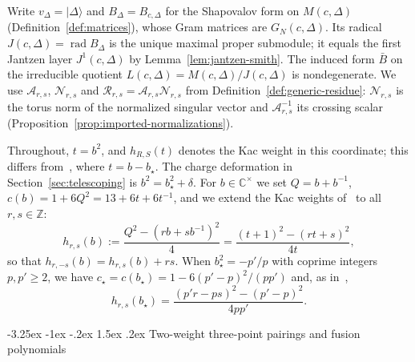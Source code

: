 \documentclass[twoside,10pt]{article}
\makeatletter
\numberwithin{equation}{section}
\theoremstyle{slbody}
\theoremstyle{definition}
\theoremstyle{remark}
\newcommand{\rad}{\operatorname{rad}}
\renewcommand{\subsection}{%
  \@startsection{subsection}{2}{\z@}%
    {-3.25ex \@plus -1ex \@minus -.2ex}%
    {1.5ex \@plus .2ex}%
    {\normalfont\normalsize\bfseries}}
\makeatother
\begin{document}
Write \(v_\Delta=\lvert\Delta\rangle\) and \(B_\Delta=B_{c,\Delta}\) for the
Shapovalov form on \(M(c,\Delta)\) (Definition~\ref{def:matrices}), whose
Gram matrices are \(G_N(c,\Delta)\).  Its radical
\(J(c,\Delta)=\rad B_\Delta\) is the unique maximal proper submodule; it equals
the first Jantzen layer \(J^1(c,\Delta)\) by Lemma~\ref{lem:jantzen-smith}.  The
induced form \(\bar B\) on the irreducible quotient
\(L(c,\Delta)=M(c,\Delta)/J(c,\Delta)\) is nondegenerate.  We use \(\mathcal{A}_{r,s}\), \(\mathcal{N}_{r,s}\) and
\(\mathcal{R}_{r,s}=\mathcal{A}_{r,s}\mathcal{N}_{r,s}\) from
Definition~\ref{def:generic-residue}: \(\mathcal{N}_{r,s}\) is the torus norm of
the normalized singular vector and \(\mathcal{A}_{r,s}^{-1}\) its crossing scalar
(Proposition~\ref{prop:imported-normalizations}).

Throughout, \(t=b^2\), and \(h_{R,S}(t)\) denotes the Kac weight in this
coordinate; this differs from~\cite[Section~7]{PolzerColliding2026}, where
\(t=b-b_\star\).  The charge deformation in Section~\ref{sec:telescoping} is
\(b^2=b_\star^2+\delta\).  For \(b\in\mathbb{C}^\times\) we set \(Q=b+b^{-1}\),
\(c(b)=1+6Q^2=13+6t+6t^{-1}\), and we extend the
Kac weights of~\cite[Definition~3.1]{PolzerColliding2026} to all \(r,s\in\mathbb{Z}\):
\begin{equation}\label{eq:kac-weight}
 h_{r,s}(b)
 :=\frac{Q^2-(rb+sb^{-1})^2}{4}
  =\frac{(t+1)^2-(rt+s)^2}{4t},
\end{equation}
so that \(h_{r,-s}(b)=h_{r,s}(b)+rs\).  When \(b_\star^2=-p'/p\) with
coprime integers \(p,p'\geq2\), we have \(c_\star=c(b_\star)=1-6(p'-p)^2/(pp')\)
and, as in~\cite[Proposition~3.2]{PolzerColliding2026},
\begin{equation}\label{eq:mm-weight}
 h_{r,s}(b_\star)
 =\frac{(p'r-ps)^2-(p'-p)^2}{4pp'}.
\end{equation}

\subsection{Two-weight three-point pairings and fusion polynomials}
\end{document}
